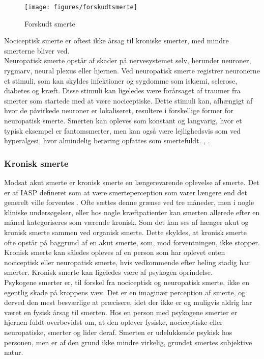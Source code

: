 \begin{figure}[H]
\begin{center}
\texttt{[image: figures/forskudtsmerte]}
	\caption{Forskudt smerte \citep{Martini}}
	\label{forskudtsmerte}
\end{center}
\end{figure}


Nociceptisk smerte er oftest ikke årsag til kroniske smerter, med mindre smerterne bliver ved.\\ 
Neuropatisk smerte opstår af skader på nervesystemet selv, herunder neuroner, rygmarv, neural plexus eller hjernen. 
Ved neuropatisk smerte registrer neuronerne et stimuli, som kan skyldes infektioner og sygdomme som iskæmi, sclerose, diabetes og kræft. Disse stimuli kan ligeledes være forårsaget af traumer fra smerter som startede med at være nociceptiske. Dette stimuli kan, afhængigt af hvor de påvirkede neuroner er lokaliseret, resultere i forskellige former for neuropatisk smerte. Smerten kan opleves som konstant og langvarig, hvor et typisk eksempel er fantomsmerter, men kan også være lejlighedsvis som ved hyperalgesi, hvor almindelig berøring opfattes som smertefuldt. \citep{Giangregorio1997}, \citep{Carmon}.

\subsubsection{Kronisk smerte}
Modsat akut smerte er kronisk smerte en længerevarende oplevelse af smerte. Det er af IASP defineret som at være smerteperception som varer længere end det generelt ville forventes \citep{Carmon}. Ofte sættes denne grænse ved tre måneder, men i nogle kliniske undersøgelser, eller hos nogle kræftpatienter kan smerten allerede efter en måned kategoriseres som værende kronisk. Som det kan ses af  hænger akut og kronisk smerte sammen ved organisk smerte. Dette skyldes, at kronisk smerte ofte opstår på baggrund af en akut smerte, som, mod forventningen, ikke stopper. Kronisk smerte kan således opleves af en person som har oplevet enten nociceptisk eller neuropatisk smerte, hvis vedkommende efter heling stadig har smerter. Kronisk smerte kan ligeledes være af psykogen oprindelse.\\
Psykogene smerter er, til forskel fra nociceptisk og neuropatisk smerte, ikke en egentlig skade på kroppens væv. Det er en imaginær perception af smerte, og derved den mest besværlige at præcisere, idet der ikke er og muligvis aldrig har været en fysisk årsag til smerten. Hos en person med psykogene smerter er hjernen fuldt overbevidst om, at den oplever fysiske, nociceptiske eller neuropatiske, smerter og lider deraf. Smerten er udelukkende psykisk hos personen, men er af den grund ikke mindre virkelig, grundet smertes subjektive natur. \citep{Giangregorio1997}

